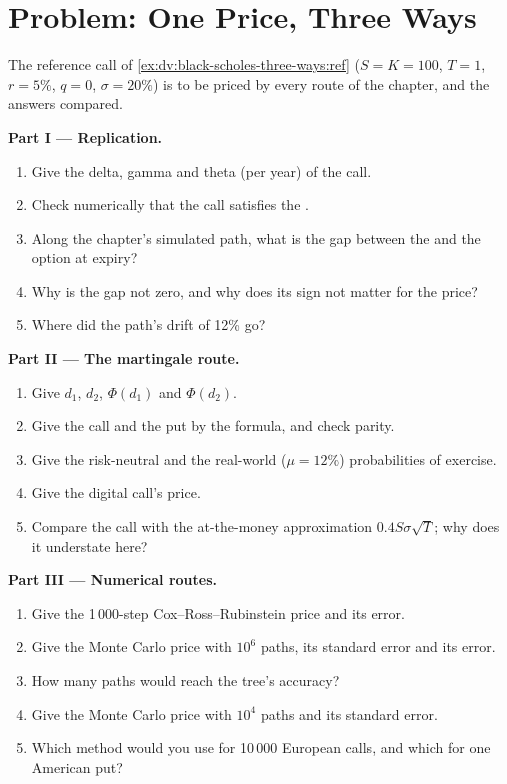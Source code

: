 \section{Problem: One Price, Three Ways}

\begin{problem}\label{pb:dv:black-scholes-three-ways:1}
The reference call of \cref{ex:dv:black-scholes-three-ways:ref} ($S=K=100$,
$T=1$, $r=5\%$, $q=0$, $\sigma=20\%$) is to be priced by every route of the
chapter, and the answers compared.

\medskip\noindent\textbf{Part I --- Replication.}
\begin{enumerate}
\item Give the delta, gamma and theta (per year) of the call.
\item Check numerically that the call satisfies the .
\item Along the chapter's simulated path, what is the gap between the  and the option at expiry?
\item Why is the gap not zero, and why does its sign not matter for the price?
\item Where did the path's drift of 12\% go?
\end{enumerate}

\medskip\noindent\textbf{Part II --- The martingale route.}
\begin{enumerate}[resume]
\item Give $d_1$, $d_2$, $\Phi(d_1)$ and $\Phi(d_2)$.
\item Give the call and the put by the formula, and check parity.
\item Give the risk-neutral and the real-world ($\mu=12\%$) probabilities of exercise.
\item Give the digital call's price.
\item Compare the call with the at-the-money approximation $0.4S\sigma\sqrt T$; why
does it understate here?
\end{enumerate}

\medskip\noindent\textbf{Part III --- Numerical routes.}
\begin{enumerate}[resume]
\item Give the 1\,000-step Cox--Ross--Rubinstein price and its error.
\item Give the Monte Carlo price with $10^6$ paths, its standard error and its error.
\item How many paths would reach the tree's accuracy?
\item Give the Monte Carlo price with $10^4$ paths and its standard error.
\item Which method would you use for 10\,000 European calls, and which for one
American put?
\end{enumerate}


\end{problem}
